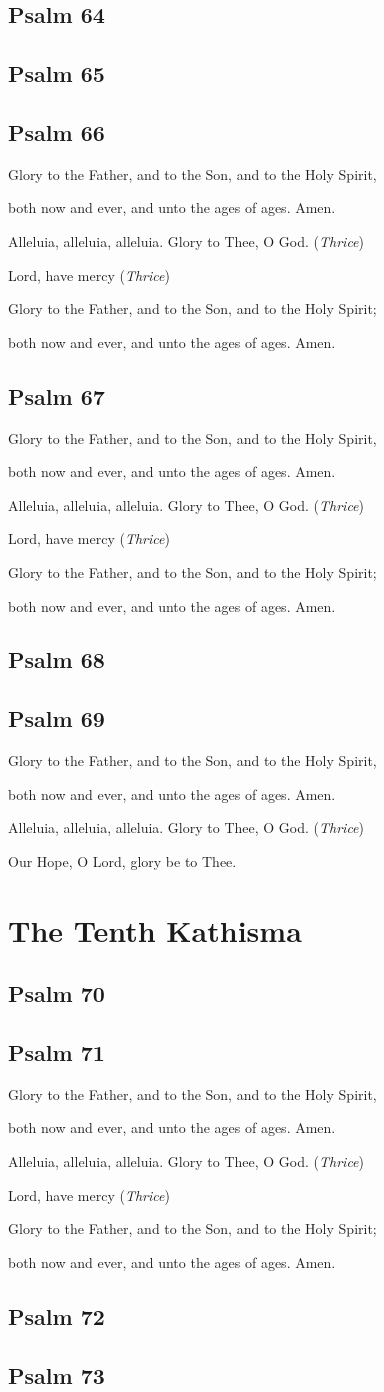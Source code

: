\documentclass[12pt,openany]{book}
\newcommand{\kathismabreak}{
  \medskip
  \begin{center}
  \begin{footnotesize}
  Glory to the Father, and to the Son, and to the Holy Spirit,
  
  both now and ever, and unto the ages of ages. Amen.

  Alleluia, alleluia, alleluia. Glory to Thee, O God. (\textit{Thrice})

  Lord, have mercy (\textit{Thrice})

  Glory to the Father, and to the Son, and to the Holy Spirit;
  
  both now and ever, and unto the ages of ages. Amen.
  \end{footnotesize}
  \end{center}
  \smallbreak
}
\newcommand{\kathismaend}{
  \medskip
  \begin{center}
  \begin{footnotesize}
  Glory to the Father, and to the Son, and to the Holy Spirit,
  
  both now and ever, and unto the ages of ages. Amen.

  Alleluia, alleluia, alleluia. Glory to Thee, O God. (\textit{Thrice})

  Our Hope, O Lord, glory be to Thee.
  \end{footnotesize}
  \end{center}
  \smallbreak
}
\begin{document}
\section{Psalm 64}

\smallskip
\section{Psalm 65}

\smallskip
\section{Psalm 66}


\kathismabreak
\smallskip
\section{Psalm 67}


\kathismabreak
\smallskip
\section{Psalm 68}

\smallskip
\pagebreak %
\section{Psalm 69}


\kathismaend

\chapter*{The Tenth Kathisma}
\smallskip
\section{Psalm 70}

\smallskip
\section{Psalm 71}


\kathismabreak
\smallskip

\pagebreak %
\section{Psalm 72}

\smallskip
\section{Psalm 73}

\end{document}
